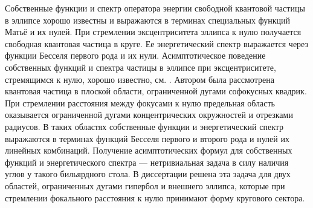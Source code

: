 Собственные функции и спектр оператора энергии свободной квантовой частицы в эллипсе хорошо известны и выражаются в терминах специальных функций Матьё и их нулей. 
При стремлении эксцентриситета эллипса к нулю получается свободная квантовая частица в круге. Ее энергетический спектр выражается через функции Бесселя первого рода и их нули.
Асимптотическое поведение собственных функций и спектра частицы в эллипсе при эксцентриситете, стремящимся к нулю, хорошо известно, см. \autocite{mclachlan,wref11}. 
Автором была рассмотрена квантовая частица в плоской области, ограниченной дугами софокусных квадрик. При стремлении расстояния между фокусами к нулю предельная область оказывается ограниченной дугами концентрических окружностей и отрезками радиусов. 
В таких областях собственные функции и энергетический спектр выражаются в терминах функций Бесселя первого и второго рода и нулей их линейных комбинаций.
Получение асимптотических формул для собственных функций и энергетического спектра --- нетривиальная задача в силу наличия углов у такого бильярдного стола.
В диссертации решена эта задача для двух областей, ограниченных дугами гипербол и внешнего эллипса, которые при стремлении фокального расстояния к нулю принимают форму кругового сектора.

%
%

